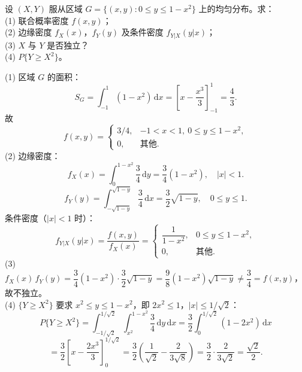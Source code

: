 \documentclass[lang=cn,11pt]{elegantbook}
\begin{document}
\begin{exercise}[抛物线区域上的均匀分布] \label{exer:3-c7b}
设 $(X,Y)$ 服从区域 $G=\{(x,y): 0 \leqslant y \leqslant 1-x^2\}$ 上的均匀分布。求：\\
(1) 联合概率密度 $f(x,y)$；\\
(2) 边缘密度 $f_X(x)$，$f_Y(y)$ 及条件密度 $f_{Y|X}(y|x)$；\\
(3) $X$ 与 $Y$ 是否独立？\\
(4) $P\{Y \geqslant X^2\}$。
\end{exercise}
\begin{solution}
(1) 区域 $G$ 的面积：
\[
S_G = \int_{-1}^1(1-x^2)\,\mathrm{d}x = \left[x-\frac{x^3}{3}\right]_{-1}^1 = \frac{4}{3}.
\]
故
\[
f(x,y) = \begin{cases} 3/4, & -1 < x < 1,\ 0 \leqslant y \leqslant 1-x^2, \\ 0, & \text{其他}. \end{cases}
\]
(2) 边缘密度：
\[
f_X(x) = \int_0^{1-x^2}\frac{3}{4}\,\mathrm{d}y = \frac{3}{4}(1-x^2),\quad |x|<1.
\]
\[
f_Y(y) = \int_{-\sqrt{1-y}}^{\sqrt{1-y}}\frac{3}{4}\,\mathrm{d}x = \frac{3}{2}\sqrt{1-y},\quad 0 \leqslant y \leqslant 1.
\]
条件密度（$|x|<1$ 时）：
\[
f_{Y|X}(y|x) = \frac{f(x,y)}{f_X(x)} = \begin{cases} \dfrac{1}{1-x^2}, & 0 \leqslant y \leqslant 1-x^2, \\ 0, & \text{其他}. \end{cases}
\]
(3) $f_X(x)\,f_Y(y) = \dfrac{3}{4}(1-x^2)\cdot\dfrac{3}{2}\sqrt{1-y} = \dfrac{9}{8}(1-x^2)\sqrt{1-y} \neq \dfrac{3}{4} = f(x,y)$，故不独立。\\
(4) $\{Y \geqslant X^2\}$ 要求 $x^2 \leqslant y \leqslant 1-x^2$，即 $2x^2 \leqslant 1$，$|x| \leqslant 1/\sqrt{2}$：
\[
P\{Y \geqslant X^2\} = \int_{-1/\sqrt{2}}^{1/\sqrt{2}}\int_{x^2}^{1-x^2}\frac{3}{4}\,\mathrm{d}y\,\mathrm{d}x = \frac{3}{2}\int_0^{1/\sqrt{2}}(1-2x^2)\,\mathrm{d}x
\]
\[
= \frac{3}{2}\left[x-\frac{2x^3}{3}\right]_0^{1/\sqrt{2}} = \frac{3}{2}\left(\frac{1}{\sqrt{2}}-\frac{2}{3\sqrt{8}}\right) = \frac{3}{2}\cdot\frac{2}{3\sqrt{2}} = \frac{\sqrt{2}}{2}.
\]
\end{solution}
\end{document}
